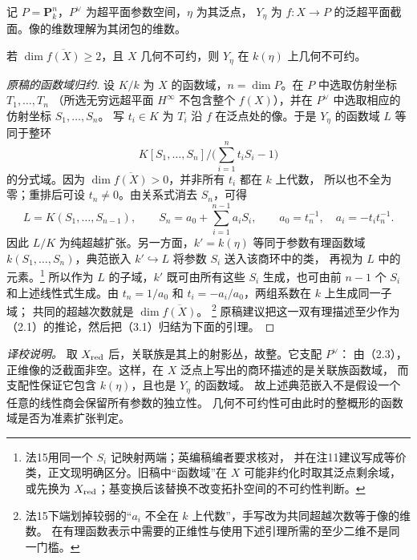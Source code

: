 \begingroup
\def\OO{\mathcal O}\def\FF{\mathcal F}\def\GG{\mathcal G}
\def\PP{\mathbf P}\def\calP{\mathcal P}\def\dd{\delta}
\def\Div{\operatorname{Div}}\def\depth{\operatorname{depth}}
\def\pr{\operatorname{pr}}\def\coker{\operatorname{coker}}
记 $P=\PP^n_k$，$P^\vee$ 为超平面参数空间，$\eta$ 为其泛点，
$Y_\eta$ 为 $f:X\to P$ 的泛超平面截面。像的维数理解为其闭包的维数。

若 $\dim\overline{f(X)}\ge 2$，且 $X$ 几何不可约，则 $Y_\eta$ 在 $k(\eta)$ 上几何不可约。

\begin{proof}[原稿的函数域归约]
设 $K/k$ 为 $X$ 的函数域，$n=\dim P$。在 $P$ 中选取仿射坐标 $T_1,\ldots,T_n$
（所选无穷远超平面 $H^\infty$ 不包含整个 $f(X)$），并在 $P^\vee$ 中选取相应的仿射坐标 $S_1,\ldots,S_n$。
写 $t_i\in K$ 为 $T_i$ 沿 $f$ 在泛点处的像。于是 $Y_\eta$ 的函数域 $L$ 等同于整环
\[
 K[S_1,\ldots,S_n]\big/\bigl(\textstyle\sum_{i=1}^n t_i S_i-1\bigr)
\]
的分式域。因为 $\dim\overline{f(X)}>0$，并非所有 $t_i$ 都在 $k$ 上代数，
所以也不全为零；重排后可设 $t_n\ne 0$。由关系式消去 $S_n$，可得
\[
 L=K(S_1,\ldots,S_{n-1}),\qquad
 S_n=a_0+\sum_{i=1}^{n-1}a_iS_i,\qquad
 a_0=t_n^{-1},\quad a_i=-t_i t_n^{-1}.
\]
因此 $L/K$ 为纯超越扩张。另一方面，$k'=k(\eta)$ 等同于参数有理函数域
$k(S_1,\ldots,S_n)$，典范嵌入 $k'\hookrightarrow L$ 将参数 $S_i$ 送入该商环中的类，
再视为 $L$ 中的元素。\footnote{法15用同一个 $S_i$ 记映射两端；英编稿编者要求核对，
并在注11建议写成等价类，正文现明确区分。旧稿中“函数域”在 $X$ 可能非约化时取其泛点剩余域，
或先换为 $X_{\rm red}$；基变换后该替换不改变拓扑空间的不可约性判断。}
所以作为 $L$ 的子域，$k'$ 既可由所有这些 $S_i$ 生成，也可由前 $n-1$ 个
$S_i$ 和上述线性式生成。由 $t_n=1/a_0$ 和 $t_i=-a_i/a_0$，两组系数在 $k$ 上生成同一子域；
共同的超越次数就是 $\dim\overline{f(X)}$。
\footnote{法15下端划掉较弱的“$a_i$ 不全在 $k$ 上代数”，手写改为共同超越次数等于像的维数。
在有理函数表示中需要的正维性与使用下述引理所需的至少二维不是同一门槛。}
原稿建议把这一双有理描述至少作为（2.1）的推论，然后把（3.1）归结为下面的引理。
\end{proof}

\noindent\emph{译校说明。}
取 $X_{\rm red}$ 后，关联族是其上的射影丛，故整。它支配 $P^\vee$：
由（2.3），正维像的泛截面非空。这样，在 $X$ 泛点上写出的商环描述的是关联族函数域，
而支配性保证它包含 $k(\eta)$，且也是 $Y_\eta$ 的函数域。
故上述典范嵌入不是假设一个任意的线性商会保留所有参数的独立性。
几何不可约性可由此时的整概形的函数域是否为准素扩张判定。

